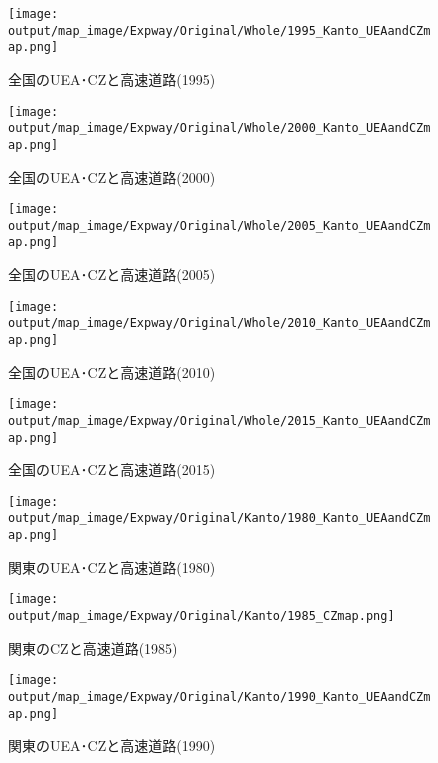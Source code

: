 \documentclass{ltjsarticle}
\begin{document}
\begin{figure}[pbth]
  \centering
  \texttt{[image: output/map\_image/Expway/Original/Whole/1995\_Kanto\_UEAandCZmap.png]}
  \caption{\label{1995:allCZandUEA:Expway}全国のUEA･CZと高速道路(1995)}
\end{figure}


\begin{figure}[pbth]
  \centering
  \texttt{[image: output/map\_image/Expway/Original/Whole/2000\_Kanto\_UEAandCZmap.png]}
  \caption{\label{2000:allCZandUEA:Expway}全国のUEA･CZと高速道路(2000)}
\end{figure}


\begin{figure}[pbth]
  \centering
  \texttt{[image: output/map\_image/Expway/Original/Whole/2005\_Kanto\_UEAandCZmap.png]}
  \caption{\label{2005:allCZandUEA:Expway}全国のUEA･CZと高速道路(2005)}
\end{figure}


\begin{figure}[pbth]
  \centering
  \texttt{[image: output/map\_image/Expway/Original/Whole/2010\_Kanto\_UEAandCZmap.png]}
  \caption{\label{2010:allCZandUEA:Expway}全国のUEA･CZと高速道路(2010)}
\end{figure}


\begin{figure}[pbth]
  \centering
  \texttt{[image: output/map\_image/Expway/Original/Whole/2015\_Kanto\_UEAandCZmap.png]}
  \caption{\label{2015:allCZandUEA:Expway}全国のUEA･CZと高速道路(2015)}
\end{figure}

\begin{figure}[pbth]
  \centering
  \texttt{[image: output/map\_image/Expway/Original/Kanto/1980\_Kanto\_UEAandCZmap.png]}
  \caption{\label{1980:KanCZandUEA:Expway}関東のUEA･CZと高速道路(1980)}
\end{figure}


\begin{figure}[pbth]
  \centering
  \texttt{[image: output/map\_image/Expway/Original/Kanto/1985\_CZmap.png]}
  \caption{\label{1985:KanCZandUEA:Expway}関東のCZと高速道路(1985)}
\end{figure}


\begin{figure}[pbth]
  \centering
  \texttt{[image: output/map\_image/Expway/Original/Kanto/1990\_Kanto\_UEAandCZmap.png]}
  \caption{\label{1990:KanCZandUEA:Expway}関東のUEA･CZと高速道路(1990)}
\end{figure}
\end{document}

